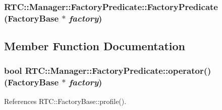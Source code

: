 \subsubsection[{FactoryPredicate}]{\setlength{\rightskip}{0pt plus 5cm}RTC::Manager::FactoryPredicate::FactoryPredicate ({\bf FactoryBase} $\ast$ {\em factory})\hspace{0.3cm}{\ttfamily  [inline]}}\label{classRTC_1_1Manager_1_1FactoryPredicate_a0727638df0c5a930f20c805ccc660a6e}


\subsection{Member Function Documentation}
\subsubsection[{operator()}]{\setlength{\rightskip}{0pt plus 5cm}bool RTC::Manager::FactoryPredicate::operator() ({\bf FactoryBase} $\ast$ {\em factory})\hspace{0.3cm}{\ttfamily  [inline]}}\label{classRTC_1_1Manager_1_1FactoryPredicate_a292a83f4047f23485d4529a3b3e0591d}


References RTC::FactoryBase::profile().

